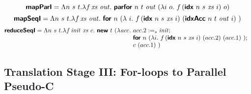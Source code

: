 \newcommand{\ei}{\prim{idx}~n~\dtone~\mathit{xs}~i}
\newcommand{\ea}{\prim{idxAcc}~n~\dttwo~\mathit{out}~i}

\begin{displaymath}
  \prim{mapParI}
  =
  \Lambda n~\dtone~\dttwo.\lambda f\,\mathit{xs}~\mathit{out}.~
  \prim{parfor}~n~\dttwo~\mathit{out}~(\lambda i~o.~f\,(\ei)~o)
\end{displaymath}
\begin{displaymath}
  \prim{mapSeqI}
  =
  \Lambda n~\dtone~\dttwo.\lambda f\,\mathit{xs}~\mathit{out}.~
  \prim{for}~n~(\lambda~i.~f\,(\ei)~(\ea)\ )
\end{displaymath}
\begin{displaymath}
  \prim{reduceSeqI}
  =
  \Lambda n~\dtone~\dttwo.\lambda f\,\mathit{init}~\mathit{xs}~c.~\prim{new}~\dttwo~(\lambda \mathit{acc}.~
    \begin{array}[t]{@{}l}
    \projtwo{acc} :=_{\dtone} \mathit{init};\\
    \prim{for}~n~(\lambda i.~f\,(\ei)~(\projtwo{acc})~(\projone{acc})\ );\\
    c~(\projone{acc})\ )
    \end{array}
\end{displaymath}

\clearpage

\subsection{Translation Stage III: For-loops to Parallel Pseudo-C}
\label{sec:translation-iii}

\newcommand{\codegenComm}[1]{\textsc{CodeGen}_{\mathsf{comm}}(#1)}
\newcommand{\codegenAcc}[2]{\textsc{CodeGen}_{\mathsf{acc}[#1]}(#2)}
\newcommand{\codegenExp}[2]{\textsc{CodeGen}_{\mathsf{exp}[#1]}(#2)}
\newcommand{\codegenData}[1]{\textsc{CodeGen}_{\mathsf{\datatype}}(#1)}

